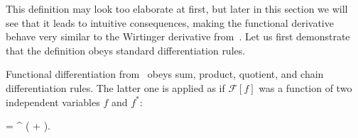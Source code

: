 This definition may look too elaborate at first, but later in this section we will see that it leads to intuitive consequences, making the functional derivative behave very similar to the Wirtinger derivative from~.
Let us first demonstrate that the definition obeys standard differentiation rules.

\begin{theorem}
	Functional differentiation from~ obeys sum, product, quotient, and chain differentiation rules.
	The latter one is applied as if $\mathcal{F}[f]$ was a function of two independent variables $f$ and $f^*$:
	\begin{eqn*}
			= \int \upd\xvec^{\prime\prime} \left(
				+ 
			\right).
	\end{eqn*}
\end{theorem}
